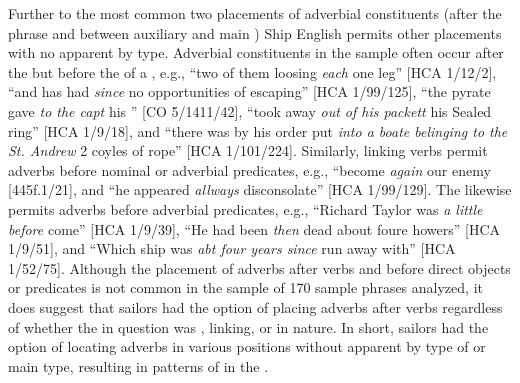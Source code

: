 Further to the most common two placements of adverbial constituents (after the  phrase and between auxiliary and main ) Ship English permits other placements with no apparent  by  type. Adverbial constituents in the sample often occur after the  but before the  of a , e.g., “two of them loosing \textit{each} one leg” [HCA 1/12/2], “and has had \textit{since} no opportunities of escaping” [HCA 1/99/125], “the pyrate gave \textit{to the capt} his ” [CO 5/1411/42], “took away \textit{out of his packett} his Sealed ring” [HCA 1/9/18], and “there was by his order put \textit{into a boate belinging to the St. Andrew} 2 coyles of rope” [HCA 1/101/224]. Similarly, linking verbs permit adverbs before nominal or adverbial predicates, e.g., “become \textit{again} our enemy [445f.1/21], and “he appeared \textit{allways} disconsolate” [HCA 1/99/129]. The  likewise permits adverbs before adverbial predicates, e.g., “Richard Taylor was \textit{a little before} come” [HCA 1/9/39], “He had been \textit{then} dead about foure howers” [HCA 1/9/51], and “Which ship was \textit{abt four years since} run away with” [HCA 1/52/75]. Although the placement of adverbs after verbs and before direct objects or predicates is not common in the sample of 170 sample phrases analyzed, it does suggest that sailors had the option of placing adverbs after verbs regardless of whether the  in question was , linking, or  in nature. In short, sailors had the option of locating adverbs in various positions without apparent  by type of  or main  type, resulting in patterns of  in the . 

